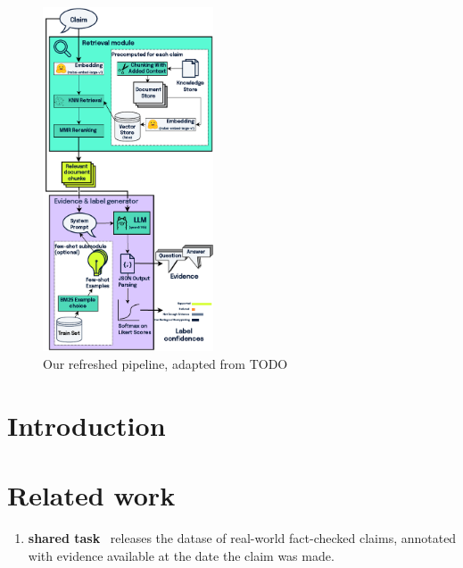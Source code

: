 
\begin{figure}[h]
    \centering
    \includegraphics[width=0.45\textwidth]{figures/pipeline.pdf}
    \caption{Our refreshed pipeline, adapted from TODO}
    \label{fig:pipeline}
\end{figure}

\section{Introduction}
\label{sec:introduction}


\section{Related work}
\label{sec:relwork}
\label{avscore}
\begin{enumerate}
    \item \textbf{\averitec{} shared task}~\cite{averitec2024} releases the datase of real-world fact-checked claims, annotated with evidence available at the date the claim was made.
\end{enumerate}

